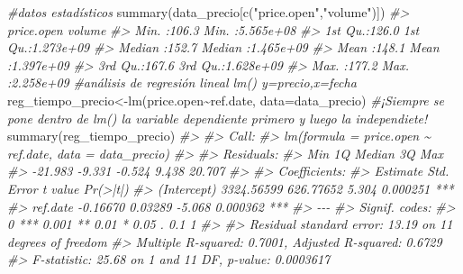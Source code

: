 \documentclass[
]{book}
\newenvironment{Shaded}{\begin{snugshade}}{\end{snugshade}}
\newcommand{\AttributeTok}[1]{\textcolor[rgb]{0.77,0.63,0.00}{#1}}
\newcommand{\CommentTok}[1]{\textcolor[rgb]{0.56,0.35,0.01}{\textit{#1}}}
\newcommand{\FunctionTok}[1]{\textcolor[rgb]{0.00,0.00,0.00}{#1}}
\newcommand{\NormalTok}[1]{#1}
\newcommand{\OtherTok}[1]{\textcolor[rgb]{0.56,0.35,0.01}{#1}}
\newcommand{\SpecialCharTok}[1]{\textcolor[rgb]{0.00,0.00,0.00}{#1}}
\newcommand{\StringTok}[1]{\textcolor[rgb]{0.31,0.60,0.02}{#1}}
\begin{document}
\begin{Shaded}
\begin{Highlighting}[]
\CommentTok{\#datos estadísticos}
\FunctionTok{summary}\NormalTok{(data\_precio[}\FunctionTok{c}\NormalTok{(}\StringTok{"price.open"}\NormalTok{,}\StringTok{"volume"}\NormalTok{)])}
\CommentTok{\#\textgreater{}    price.open        volume         }
\CommentTok{\#\textgreater{}  Min.   :106.3   Min.   :5.565e+08  }
\CommentTok{\#\textgreater{}  1st Qu.:126.0   1st Qu.:1.273e+09  }
\CommentTok{\#\textgreater{}  Median :152.7   Median :1.465e+09  }
\CommentTok{\#\textgreater{}  Mean   :148.1   Mean   :1.397e+09  }
\CommentTok{\#\textgreater{}  3rd Qu.:167.6   3rd Qu.:1.628e+09  }
\CommentTok{\#\textgreater{}  Max.   :177.2   Max.   :2.258e+09}
\CommentTok{\#análisis de regresión lineal lm() y=precio,x=fecha}
\NormalTok{reg\_tiempo\_precio}\OtherTok{\textless{}{-}}\FunctionTok{lm}\NormalTok{(price.open}\SpecialCharTok{\textasciitilde{}}\NormalTok{ref.date, }\AttributeTok{data=}\NormalTok{data\_precio) }
\CommentTok{\#¡Siempre se pone dentro de lm() la variable dependiente primero y luego la independiete!}
\FunctionTok{summary}\NormalTok{(reg\_tiempo\_precio)}
\CommentTok{\#\textgreater{} }
\CommentTok{\#\textgreater{} Call:}
\CommentTok{\#\textgreater{} lm(formula = price.open \textasciitilde{} ref.date, data = data\_precio)}
\CommentTok{\#\textgreater{} }
\CommentTok{\#\textgreater{} Residuals:}
\CommentTok{\#\textgreater{}     Min      1Q  Median      3Q     Max }
\CommentTok{\#\textgreater{} {-}21.983  {-}9.331  {-}0.524   9.438  20.707 }
\CommentTok{\#\textgreater{} }
\CommentTok{\#\textgreater{} Coefficients:}
\CommentTok{\#\textgreater{}               Estimate Std. Error t value Pr(\textgreater{}|t|)    }
\CommentTok{\#\textgreater{} (Intercept) 3324.56599  626.77652   5.304 0.000251 ***}
\CommentTok{\#\textgreater{} ref.date      {-}0.16670    0.03289  {-}5.068 0.000362 ***}
\CommentTok{\#\textgreater{} {-}{-}{-}}
\CommentTok{\#\textgreater{} Signif. codes:  }
\CommentTok{\#\textgreater{} 0 \textquotesingle{}***\textquotesingle{} 0.001 \textquotesingle{}**\textquotesingle{} 0.01 \textquotesingle{}*\textquotesingle{} 0.05 \textquotesingle{}.\textquotesingle{} 0.1 \textquotesingle{} \textquotesingle{} 1}
\CommentTok{\#\textgreater{} }
\CommentTok{\#\textgreater{} Residual standard error: 13.19 on 11 degrees of freedom}
\CommentTok{\#\textgreater{} Multiple R{-}squared:  0.7001, Adjusted R{-}squared:  0.6729 }
\CommentTok{\#\textgreater{} F{-}statistic: 25.68 on 1 and 11 DF,  p{-}value: 0.0003617}


\end{Highlighting}
\end{Shaded}
\end{document}

